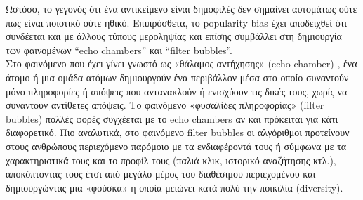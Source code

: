  \noindent Ωστόσο, το γεγονός ότι ένα αντικείμενο είναι δημοφιλές δεν σημαίνει αυτομάτως ούτε πως είναι ποιοτικό ούτε ηθικό. Επιπρόσθετα, το popularity bias έχει αποδειχθεί ότι συνδέεται και με άλλους τύπους μεροληψίας και επίσης συμβάλλει στη δημιουργία των φαινομένων “echo chambers” και “filter bubbles”.\\
 Στο φαινόμενο που έχει γίνει γνωστό ως «θάλαμος αντήχησης» (echo chamber) \cite{sunsteinEchoChambersBush2001}, ένα άτομο ή μια ομάδα ατόμων δημιουργούν ένα περιβάλλον μέσα στο οποίο συναντούν μόνο πληροφορίες ή απόψεις που αντανακλούν ή ενισχύουν τις δικές τους, χωρίς να συναντούν αντίθετες απόψεις. 
Το φαινόμενο «φυσαλίδες πληροφορίας» (filter bubbles) πολλές φορές συγχέεται με το echo chambers αν και πρόκειται για κάτι διαφορετικό. Πιο αναλυτικά, στο φαινόμενο filter bubbles οι αλγόριθμοι προτείνουν στους ανθρώπους περιεχόμενο παρόμοιο με τα ενδιαφέροντά τους ή σύμφωνα με τα χαρακτηριστικά τους και το προφίλ τους (παλιά κλικ, ιστορικό αναζήτησης κτλ.), αποκόπτοντας τους έτσι από μεγάλο μέρος του διαθέσιμου περιεχομένου και δημιουργώντας μια «φούσκα» η οποία μειώνει κατά πολύ την ποικιλία (diversity).\\
